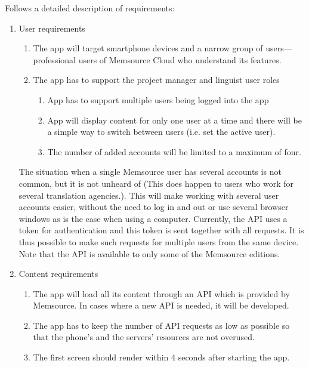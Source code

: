 Follows a detailed description of requirements:


\begin{enumerate}
	\item User requirements
	\begin{enumerate}[label*=\arabic*.]
		\item The app will target smartphone devices and a narrow group of users---professional users of Memsource Cloud who understand its features. 
		\item The app has to support the project manager and linguist user roles 
		\begin{enumerate}[label*=\arabic*.]
			\item App has to support multiple users being logged into the app
			\item App will display content for only one user at a time and there will be a simple way to switch between users (i.e. set the active user).
			\item The number of added accounts will be limited to a maximum of four.
		\end{enumerate}
	\end{enumerate}
	
	The situation when a single Memsource user has several accounts is not common, but it is not unheard of (This does happen to users who work for several translation agencies.). This will make working with several user accounts easier, without the need to log in and out or use several browser windows as is the case when using a computer. Currently, the API uses a token for authentication and this token is sent together with all requests. It is thus possible to make such requests for multiple users from the same device. Note that the API is available to only some of the Memsource editions.  
	
	\item Content requirements
	\begin{enumerate}[label*=\arabic*.]
		\item The app will load all its content through an API which is provided by Memsource. In cases where a new API is needed, it will be developed.
		\item The app has to keep the number of API requests as low as possible so that the phone's and the servers' resources are not overused.
		\item The first screen should render within 4 seconds after starting the app.
	\end{enumerate}
	

\end{enumerate}
